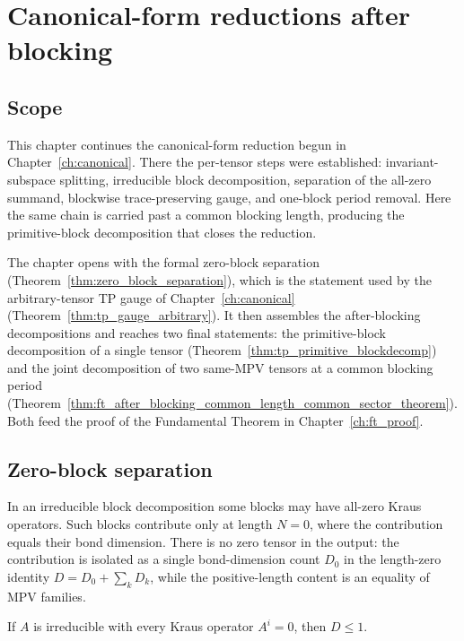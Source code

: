 \chapter{Canonical-form reductions after blocking}\label{ch:canonical_after_blocking}

\section{Scope}

This chapter continues the canonical-form reduction begun in
Chapter~\ref{ch:canonical}. There the per-tensor steps were established:
invariant-subspace splitting, irreducible block decomposition, separation of the
all-zero summand, blockwise trace-preserving gauge, and one-block period removal.
Here the same chain is carried past a common blocking length, producing the
primitive-block decomposition that closes the reduction.

The chapter opens with the formal zero-block separation
(Theorem~\ref{thm:zero_block_separation}), which is the statement used by the
arbitrary-tensor TP gauge of Chapter~\ref{ch:canonical}
(Theorem~\ref{thm:tp_gauge_arbitrary}). It then assembles the after-blocking
decompositions and reaches two final statements: the primitive-block
decomposition of a single tensor (Theorem~\ref{thm:tp_primitive_blockdecomp})
and the joint decomposition of two same-MPV tensors at a common blocking period
(Theorem~\ref{thm:ft_after_blocking_common_length_common_sector_theorem}). Both
feed the proof of the Fundamental Theorem in Chapter~\ref{ch:ft_proof}.

\section{Zero-block separation}%
\label{sec:zero_block_separation}

In an irreducible block decomposition some blocks may have all-zero Kraus
operators. Such blocks contribute only at length $N=0$, where the contribution
equals their bond dimension. There is no zero tensor in the output: the
contribution is isolated as a single bond-dimension count $D_0$ in the
length-zero identity $D = D_0 + \sum_k D_k$, while the positive-length content is
an equality of MPV families.

\begin{lemma}%
    \label{lem:irreducible_allZero_dim_le_one}
    \leanok
    If $A$ is irreducible with every Kraus operator $A^i = 0$, then $D \le 1$.
\end{lemma}

